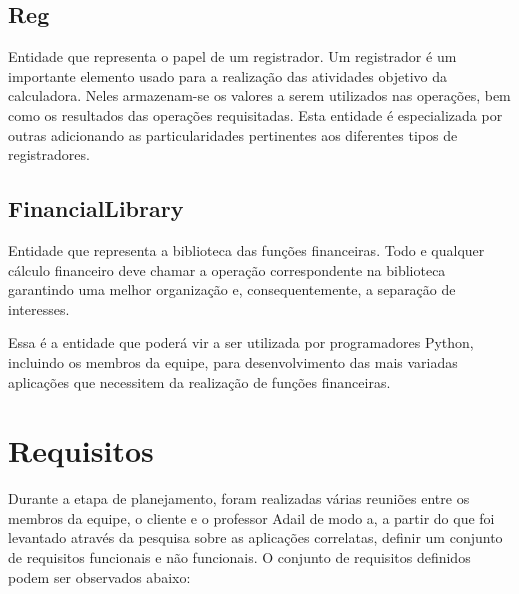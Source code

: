 \subsection{Reg}
Entidade que representa o papel de um registrador. Um registrador é um importante elemento usado para a realização das atividades objetivo da calculadora. Neles armazenam-se os valores a serem utilizados nas operações, bem como os resultados das operações requisitadas. Esta entidade é especializada por outras adicionando as particularidades pertinentes aos diferentes tipos de registradores.

\subsection{FinancialLibrary}
Entidade que representa a biblioteca das funções financeiras. Todo e qualquer cálculo financeiro deve chamar a operação correspondente na biblioteca garantindo uma melhor organização e, consequentemente, a separação de interesses.

Essa é a entidade que poderá vir a ser utilizada por programadores Python, incluindo os membros da equipe, para desenvolvimento das mais variadas aplicações que necessitem da realização de funções financeiras.

\section{Requisitos}

Durante a etapa de planejamento, foram realizadas várias reuniões entre os membros da equipe, o cliente e o professor Adail de modo a, a partir do que foi levantado através da pesquisa sobre as aplicações correlatas, definir um conjunto de requisitos funcionais e não funcionais. O conjunto de requisitos definidos podem ser observados abaixo:


